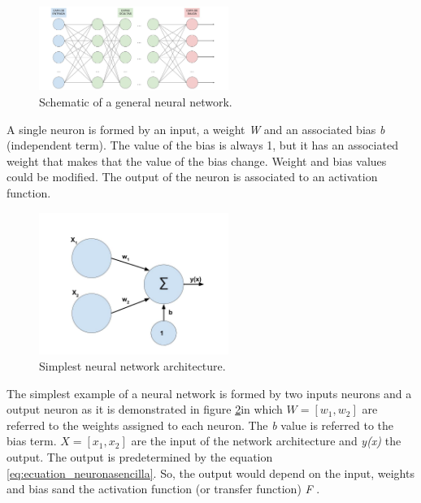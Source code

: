 \begin{figure}[htb]
\centering
\includegraphics[width=0.55\textwidth]{images_miscelaneus/red_neuronal.jpg}
\caption{Schematic of a general neural network.} \label{fig:esquemaneuronal}
\end{figure}

A single neuron is formed by an input, a weight \textit{W} and an associated bias \textit{b} (independent term). The value of the bias is always 1, but it has an associated weight that makes that the value of the bias change. Weight and bias values could be modified. The output of the neuron is associated to an activation function. \\

\begin{figure}[htb]
\centering
\includegraphics[width=0.55\textwidth]{images_miscelaneus/neurona_sencilla.jpg}
\caption{Simplest neural network architecture.} \label{fig:neuronasencilla}
\end{figure}

The simplest example of a neural network is formed by two inputs neurons and a output neuron as it is demonstrated in figure \ref{fig:neuronasencilla}in which \textit{$W=[w_1,w_2]$} are referred to the weights assigned to each neuron. The \textit{b} value is referred to the bias term. \textit{$X=[x_{1},x_{2}]$} are the input of the network architecture and \textit{y(x)} the output. The output is predetermined by the equation \ref{eq:ecuation_neuronasencilla}. So, the output would depend on the input, weights and bias sand the activation function (or transfer function) \textit{F} \cite{krose}. \\

